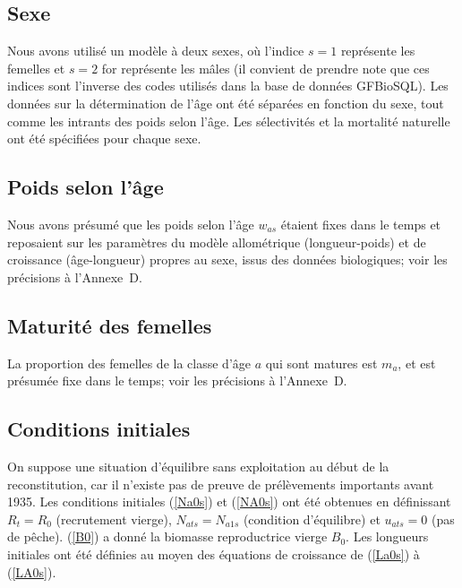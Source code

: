 \documentclass[11pt]{book}
\newcommand{\AppBio}{Annexe~D}
\newcommand{\eref}[1]{(\ref{#1})}
\begin{document}
\subsection{Sexe}

Nous avons utilis\'{e} un mod\`{e}le \`{a} deux sexes, o\`{u} l'indice $s{=}1$ repr\'{e}sente les femelles et $s{=}2$ for repr\'{e}sente les m\^{a}les (il convient de prendre note que ces indices sont l'inverse des codes utilis\'{e}s dans la base de donn\'{e}es GFBioSQL). Les donn\'{e}es sur la d\'{e}termination de l'\^{a}ge ont \'{e}t\'{e} s\'{e}par\'{e}es en fonction du sexe, tout comme les intrants des poids selon l'\^{a}ge. Les s\'{e}lectivit\'{e}s et la mortalit\'{e} naturelle ont \'{e}t\'{e} sp\'{e}cifi\'{e}es pour chaque sexe.

\subsection{Poids selon l'\^{a}ge}

Nous avons pr\'{e}sum\'{e} que les poids selon l'\^{a}ge $w_{as}$ \'{e}taient fixes dans le temps et reposaient sur les param\`{e}tres du mod\`{e}le allom\'{e}trique (longueur-poids) et de croissance (\^{a}ge-longueur) propres au sexe, issus des donn\'{e}es biologiques; voir les pr\'{e}cisions \`{a} l'\AppBio{}.

\subsection{Maturit\'{e} des femelles}

La proportion des femelles de la classe d'\^{a}ge $a$ qui sont matures est $m_a$, et est pr\'{e}sum\'{e}e fixe dans le temps; voir les pr\'{e}cisions \`{a} l'\AppBio{}.

\subsection{Conditions initiales}

On suppose une situation d'\'{e}quilibre sans exploitation au d\'{e}but de la reconstitution, car il n'existe pas de preuve de pr\'{e}l\`{e}vements importants avant 1935.
Les conditions initiales \eref{Na0s} et \eref{NA0s} ont \'{e}t\'{e} obtenues en d\'{e}finissant $R_t = R_0$ (recrutement vierge), $N_{ats} = N_{a1s}$ (condition d'\'{e}quilibre) et $u_{ats} = 0$ (pas de p\^{e}che).
\eref{B0} a donn\'{e} la biomasse reproductrice vierge $B_0$.
Les longueurs initiales ont \'{e}t\'{e} d\'{e}finies au moyen des \'{e}quations de croissance de \citet{Schnute:1981} \eref{La0s} \`{a} \eref{LA0s}.
\end{document}
